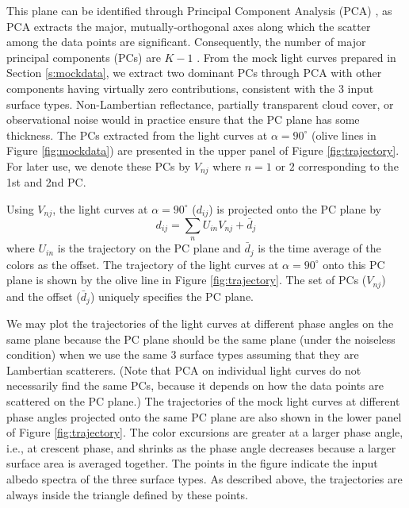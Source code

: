 \documentclass[iop,numberedappendix,apj,]{emulateapj}
\begin{document}
This plane can be identified through Principal Component Analysis (PCA) \citep{Cowan2009,Cowan2011}, as PCA extracts the major, mutually-orthogonal axes along which the scatter among the data points are significant. 
Consequently, the number of major principal components (PCs) are $K-1$ \citep{Cowan2011}. 
From the mock light curves prepared in Section \ref{s:mockdata}, we extract two dominant PCs through PCA with other components having virtually zero contributions, consistent with the 3 input surface types.  
{\color{red} Non-Lambertian reflectance, partially transparent cloud cover, or observational noise would in practice ensure that the PC plane has some thickness. }
The PCs extracted from the light curves at $\alpha = 90^{\circ }$ (olive lines in Figure \ref{fig:mockdata}) are presented in the upper panel of Figure \ref{fig:trajectory}. 
For later use, we denote these PCs by $V_{nj}$ where $n=1$ or $2$  corresponding to the 1st and 2nd PC. 

Using $V_{nj}$, the light curves at $\alpha = 90^{\circ }$ ($d_{ij}$) is projected onto the PC plane by
\begin{equation}
d_{ij} = \sum_n U_{in} V_{nj} + \bar d_j
\end{equation}
where $U_{in}$ is the trajectory on the PC plane and $\bar d_j$ is the time average of the colors as the offset. 
The trajectory of the light curves at $\alpha = 90^{\circ }$ onto this PC plane is shown by the olive line in Figure \ref{fig:trajectory}. 
The set of PCs ($V_{nj}$) and the offset ($\bar d_j$) uniquely specifies the PC plane. 

We may plot the trajectories of the light curves at different phase angles on the same plane because the PC plane should be the same plane (under the noiseless condition) when we use the same 3 surface types assuming that they are Lambertian scatterers. 
(Note that PCA on individual light curves do not necessarily find the same PCs, because it depends on how the data points are scattered on the PC plane.)
The trajectories of the mock light curves at different phase angles projected onto the same PC plane are also shown in the lower panel of Figure \ref{fig:trajectory}. 
The color excursions are greater at a larger phase angle, i.e., at crescent phase, and shrinks as the phase angle decreases because a larger surface area is averaged together.  
The points in the figure indicate the input albedo spectra of the three surface types. 
As described above, the trajectories are always inside the triangle defined by these points. 
\end{document}
